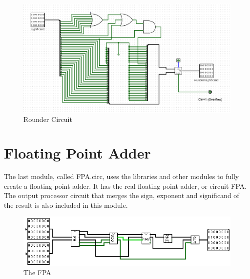 \documentclass[a4paper,12pt]{article}
\begin{document}
\begin{figure}[htbp]
    \centering
    \includegraphics[width=1\textwidth]{rounder.png}
    \caption{Rounder Circuit}
    \label{rounder}
\end{figure}


\section{Floating Point Adder}
The last module, called FPA.circ, uses the libraries and other modules to fully create a
 floating point adder. It has the real floating point adder, or circuit FPA. The output processor
 circuit that merges the sign, exponent and significand of the result is also included in this
 module.
 
 \begin{figure}[htbp]
    \centering
    \includegraphics[width=1\textwidth]{FPA.png}
    \caption{The FPA}
    \label{FPA}
\end{figure}
\end{document}
